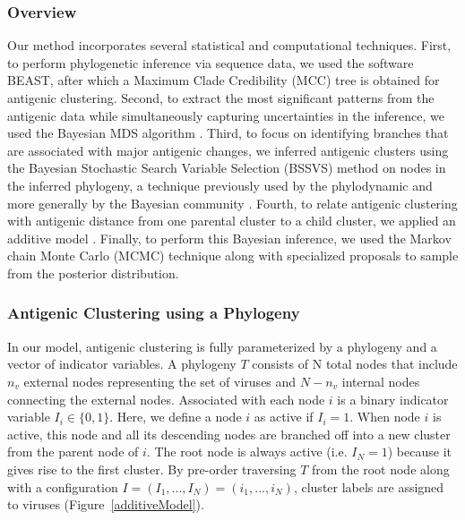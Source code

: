 \documentclass[11pt,oneside,letterpaper]{article}
\begin{document}
\subsubsection*{Overview}
Our method incorporates several statistical and computational techniques. 
First, to perform phylogenetic inference via sequence data, we used the software BEAST, after which a Maximum Clade Credibility (MCC) tree is obtained for antigenic clustering.
Second, to extract the most significant patterns from the antigenic data while simultaneously capturing uncertainties in the inference, we used the Bayesian MDS algorithm \cite{oh_bayesian_2001}.
Third, to focus on identifying branches that are associated with major antigenic changes, we inferred antigenic clusters using the Bayesian Stochastic Search Variable Selection (BSSVS) method on nodes in the inferred phylogeny, a technique previously used by the phylodynamic \cite{lemey_bayesian_2009, drummond_bayesian_2010} and more generally by the Bayesian community \cite{kuo_variable_1998, hugh_chipman_practical_2001}.
Fourth, to relate antigenic clustering with antigenic distance from one parental cluster to a child cluster, we applied an additive model \cite{drummond_bayesian_2010}.
Finally, to perform this Bayesian inference, we used the Markov chain Monte Carlo (MCMC) technique along with specialized proposals to sample from the posterior distribution. 







\subsubsection*{Antigenic Clustering using a Phylogeny}

In our model, antigenic clustering is fully parameterized by  a phylogeny and a vector of indicator variables.
A phylogeny $T$ consists of N total nodes that include $n_v$ external nodes representing the set of viruses and $N-n_v$ internal nodes connecting the external nodes.
Associated with each node $i$ is a binary indicator variable $I_i \in \{0,1\}$. 
Here, we define a node $i$ as active if $I_i = 1$.
When node $i$ is active, this node and all its descending nodes are branched off into a new cluster from the parent node of $i$.
The root node is always active (i.e. $I_{N} = 1$) because it gives rise to the first cluster.
By pre-order traversing $T$ from the root node along with a configuration $I=(I_1, ..., I_N)=(i_1, ..., i_N)$, cluster labels are assigned to viruses (Figure~\ref{additiveModel}).
\end{document}
